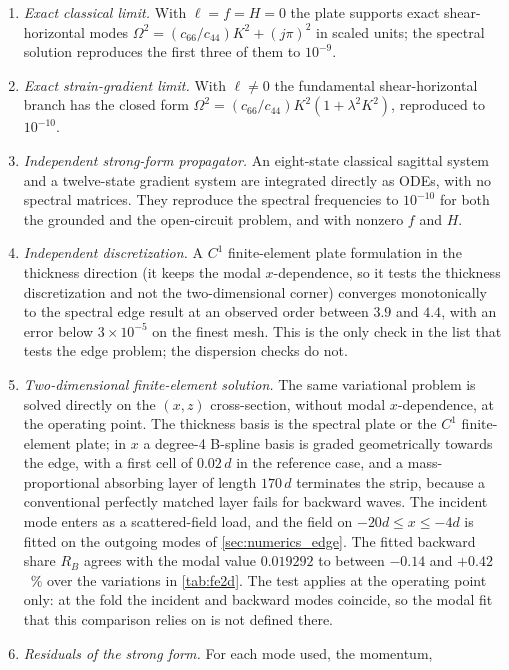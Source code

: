 \begin{enumerate}
\item \emph{Exact classical limit.}  With $\ell=f=H=0$ the plate supports
exact shear-horizontal modes $\Omega^{2}=(c_{66}/c_{44})K^{2}+(j\pi)^{2}$ in scaled
units; the spectral
solution reproduces the first three of them to $10^{-9}$.
\item \emph{Exact strain-gradient limit.}  With $\ell\neq0$ the fundamental
shear-horizontal branch has the closed form
$\Omega^{2}=(c_{66}/c_{44})K^{2}(1+\lambda^{2}K^{2})$, reproduced to $10^{-10}$.
\item \emph{Independent strong-form propagator.}  An eight-state classical
sagittal system and a twelve-state gradient system are integrated directly as
ODEs, with no spectral matrices.  They reproduce the spectral frequencies to
$10^{-10}$ for both the grounded and the open-circuit problem, and with
nonzero $f$ and $H$.
\item \emph{Independent discretization.}  A $C^1$ finite-element plate
formulation in the thickness direction (it keeps the modal $x$-dependence, so it tests the thickness discretization and not the two-dimensional corner) converges monotonically to the spectral
edge result at an observed order between $3.9$ and $4.4$, with an error below
$3\times10^{-5}$ on the finest mesh.  This is the only check in the list that tests the edge problem; the dispersion checks do not.
\item \emph{Two-dimensional finite-element solution.}  The same variational problem is solved directly on the $(x,z)$ cross-section, without modal $x$-dependence, at the operating point.  The thickness basis is the spectral plate or the $C^{1}$ finite-element plate; in $x$ a degree-4 B-spline basis is graded geometrically towards the edge, with a first cell of $0.02\,d$ in the reference case, and a mass-proportional absorbing layer of length $170\,d$ terminates the strip, because a conventional perfectly matched layer fails for backward waves.  The incident mode enters as a scattered-field load, and the field on $-20d\le x\le-4d$ is fitted on the outgoing modes of \cref{sec:numerics_edge}.  The fitted backward share $R_B$ agrees with the modal value $0.019292$ to between $-0.14$ and $+0.42$~\% over the variations in \cref{tab:fe2d}.  The test applies at the operating point only: at the fold the incident and backward modes coincide, so the modal fit that this comparison relies on is not defined there.
\item \emph{Residuals of the strong form.}  For each mode used, the momentum,

\end{enumerate}
